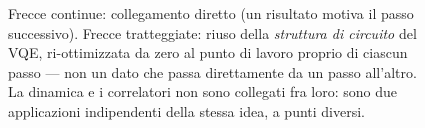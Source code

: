 \documentclass[11pt,a4paper]{article}
\begin{document}
\begin{figure}[htbp]
\caption{Frecce continue: collegamento diretto (un risultato motiva il
passo successivo). Frecce tratteggiate: riuso della \emph{struttura di
circuito} del VQE, ri-ottimizzata da zero al punto di lavoro proprio di
ciascun passo --- non un dato che passa direttamente da un passo
all'altro. La dinamica e i correlatori non sono collegati fra loro: sono
due applicazioni indipendenti della stessa idea, a punti diversi.}
\end{figure}
\end{document}

